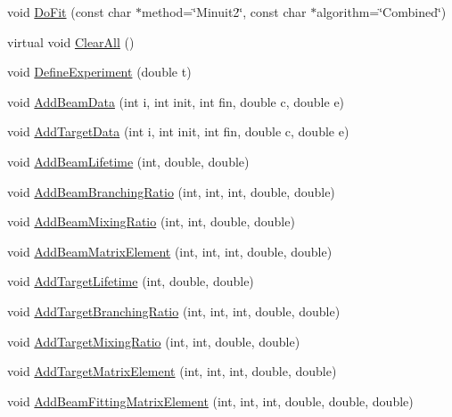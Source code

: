 \begin{DoxyCompactItemize}
\item 
void \hyperlink{classCoulExSimFitter_ad5cfafc630353728fc475dee4f416e3e}{Do\-Fit} (const char $\ast$method=\char`\"{}Minuit2\char`\"{}, const char $\ast$algorithm=\char`\"{}Combined\char`\"{})
\item 
virtual void \hyperlink{classCoulExSimFitter_a336cebbb05f665e879cf945288cd4a92}{Clear\-All} ()
\item 
void \hyperlink{classCoulExSimFitter_ab76717d256f884ad458cc64a9c4cbbd6}{Define\-Experiment} (double t)
\item 
void \hyperlink{classCoulExSimFitter_abd66fba489f3f3eafd70b729f2a56d2a}{Add\-Beam\-Data} (int i, int init, int fin, double c, double e)
\item 
void \hyperlink{classCoulExSimFitter_abdfaf0502ad8be70258a652704e8353a}{Add\-Target\-Data} (int i, int init, int fin, double c, double e)
\item 
void \hyperlink{classCoulExSimFitter_a49e980169ce03a95e003ee789a7a093f}{Add\-Beam\-Lifetime} (int, double, double)
\item 
void \hyperlink{classCoulExSimFitter_a6a34bc77405a8c544b4631d89e341bc7}{Add\-Beam\-Branching\-Ratio} (int, int, int, double, double)
\item 
void \hyperlink{classCoulExSimFitter_a6898c4b40c84c2550c715a8e5ffb7e24}{Add\-Beam\-Mixing\-Ratio} (int, int, double, double)
\item 
void \hyperlink{classCoulExSimFitter_a711b45e6d0ccd533421a279e12abe7ba}{Add\-Beam\-Matrix\-Element} (int, int, int, double, double)
\item 
void \hyperlink{classCoulExSimFitter_a5bc5460b494e5192955ca4e17f7e737e}{Add\-Target\-Lifetime} (int, double, double)
\item 
void \hyperlink{classCoulExSimFitter_ad7da9aa7feb7b6e84b553e29bb70edfb}{Add\-Target\-Branching\-Ratio} (int, int, int, double, double)
\item 
void \hyperlink{classCoulExSimFitter_a06812af2e0f8d29cd37b9a2c48239d5c}{Add\-Target\-Mixing\-Ratio} (int, int, double, double)
\item 
void \hyperlink{classCoulExSimFitter_a5bbd56a27559747b96fa0c2e696ed9af}{Add\-Target\-Matrix\-Element} (int, int, int, double, double)
\item 
void \hyperlink{classCoulExSimFitter_ae9617c526ced92e93aa33e8e849f8221}{Add\-Beam\-Fitting\-Matrix\-Element} (int, int, int, double, double, double)
\item 

\end{DoxyCompactItemize}
